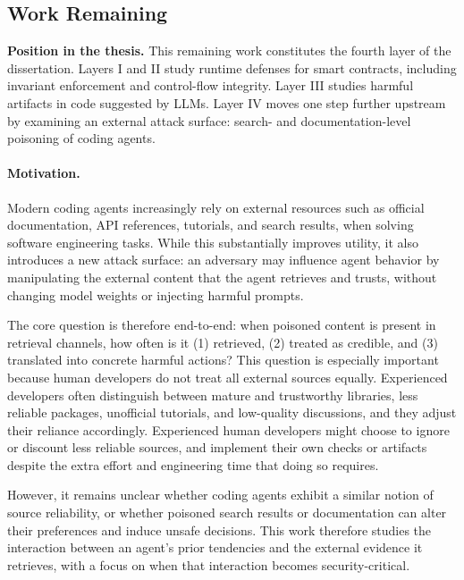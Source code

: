 \subsection{Work Remaining}

\noindent \textbf{Position in the thesis.}
This remaining work constitutes the fourth layer of the dissertation.
Layers I and II study runtime defenses for smart contracts, including invariant enforcement 
and control-flow integrity.
Layer III studies harmful artifacts in code suggested by LLMs.
Layer IV moves one step further upstream by examining an external attack surface:
search- and documentation-level poisoning of coding agents.

\paragraph{Motivation.}
Modern coding agents increasingly rely on external resources such as official documentation,
API references, tutorials, and search results, when solving software engineering tasks.
While this substantially improves utility, it also introduces a new attack surface:
an adversary may influence agent behavior by manipulating the external 
content that the agent retrieves and trusts,
without changing model weights or injecting harmful prompts.

The core question is therefore end-to-end:
when poisoned content is present in retrieval channels, how often is it
(1) retrieved,
(2) treated as credible,
and (3) translated into concrete harmful actions?
This question is especially important because human developers do not 
treat all external sources equally.
Experienced developers often distinguish between mature and trustworthy libraries,
less reliable packages, unofficial tutorials, and low-quality discussions,
and they adjust their reliance accordingly. 
Experienced human developers might choose to ignore or discount 
less reliable sources, and implement their own checks or artifacts despite 
the extra effort and engineering time that doing so requires. 

However, it remains unclear whether coding agents exhibit a similar notion of source reliability,
or whether poisoned search results or documentation can alter their preferences 
and induce unsafe decisions.
This work therefore studies the interaction between an agent's prior tendencies and 
the external evidence it retrieves,
with a focus on when that interaction becomes security-critical.

